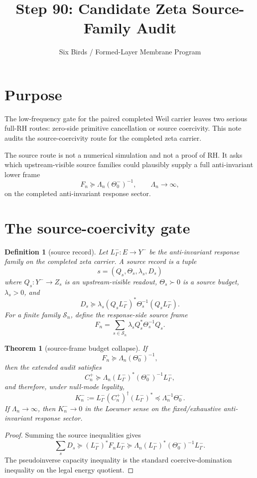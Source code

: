 \documentclass[11pt]{article}
\title{Step 90: Candidate Zeta Source-Family Audit}
\author{Six Birds / Formed-Layer Membrane Program}
\date{}
\newtheorem{theorem}{Theorem}
\newtheorem{definition}{Definition}
\begin{document}
\maketitle

\section{Purpose}
The low-frequency gate for the paired completed Weil carrier leaves two serious full-RH routes: zero-side primitive cancellation or source coercivity.  This note audits the source-coercivity route for the completed zeta carrier.

The source route is not a numerical simulation and not a proof of RH.  It asks which upstream-visible source families could plausibly supply a full anti-invariant lower frame
\[
F_n\succeq \Lambda_n(\Theta_0^-)^{-1},\qquad \Lambda_n\to\infty,
\]
on the completed anti-invariant response sector.

\section{The source-coercivity gate}
\begin{definition}[source record]
Let \(L^-_\Gamma:E\to Y^-\) be the anti-invariant response family on the completed zeta carrier.  A source record is a tuple
\[
s=(Q_s,\Theta_s,\lambda_s,D_s)
\]
where \(Q_s:Y^-\to Z_s\) is an upstream-visible readout, \(\Theta_s\succ0\) is a source budget, \(\lambda_s>0\), and
\[
D_s\succeq \lambda_s (Q_sL^-_\Gamma)^*\Theta_s^{-1}(Q_sL^-_\Gamma).
\]
For a finite family \(\mathcal S_n\), define the response-side source frame
\[
F_n=\sum_{s\in\mathcal S_n}\lambda_s Q_s^*\Theta_s^{-1}Q_s.
\]
\end{definition}

\begin{theorem}[source-frame budget collapse]
If
\[
F_n\succeq \Lambda_n(\Theta_0^-)^{-1},
\]
then the extended audit satisfies
\[
C_n^+\succeq \Lambda_n (L^-_\Gamma)^*(\Theta_0^-)^{-1}L^-_\Gamma,
\]
and therefore, under null-mode legality,
\[
K_n^-:=L^-_\Gamma(C_n^+)^\dagger(L^-_\Gamma)^*\preceq \Lambda_n^{-1}\Theta_0^-.
\]
If \(\Lambda_n\to\infty\), then \(K_n^-\to0\) in the Loewner sense on the fixed/exhaustive anti-invariant response sector.
\end{theorem}

\begin{proof}
Summing the source inequalities gives
\[
\sum_sD_s\succeq (L^-_\Gamma)^*F_nL^-_\Gamma\succeq \Lambda_n(L^-_\Gamma)^*(\Theta_0^-)^{-1}L^-_\Gamma.
\]
The pseudoinverse capacity inequality is the standard coercive-domination inequality on the legal energy quotient.
\end{proof}
\end{document}
